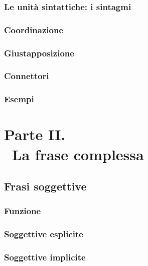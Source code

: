 \documentclass[a4paper,twoside,11pt,chapterprefix=false,bibliography=totocnumbered,listof=flat]{scrbook}
\begin{document}
\hypertarget{le-unita-sintattiche-i-sintagmi}{%
\section{Le unità sintattiche: i
sintagmi}\label{le-unita-sintattiche-i-sintagmi}}

\hypertarget{coordinazione}{%
\section{Coordinazione}\label{coordinazione}}

\hypertarget{giustapposizione}{%
\section{Giustapposizione}\label{giustapposizione}}

\hypertarget{connettori}{%
\section{Connettori}\label{connettori}}

\hypertarget{esempi}{%
\section{Esempi}\label{esempi}}

\part*{Parte II. \\\ La frase complessa}

\hypertarget{frasi-soggettive}{%
\chapter{Frasi soggettive}\label{frasi-soggettive}}

\hypertarget{funzione}{%
\section{Funzione}\label{funzione}}

\hypertarget{soggettive-esplicite}{%
\section{Soggettive esplicite}\label{soggettive-esplicite}}

\hypertarget{soggettive-implicite}{%
\section{Soggettive implicite}\label{soggettive-implicite}}
\end{document}
